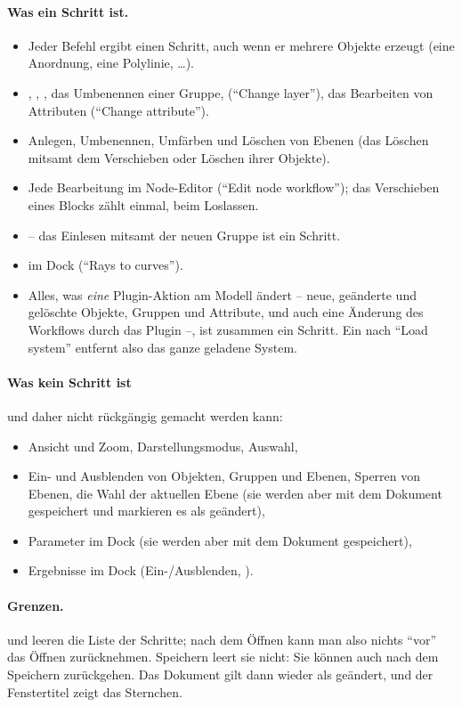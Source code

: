 \paragraph{Was ein Schritt ist.}
\begin{itemize}
  \item Jeder Befehl ergibt einen Schritt, auch wenn er mehrere Objekte erzeugt (eine
    Anordnung, eine Polylinie, \dots).
  \item {}, , , das Umbenennen einer Gruppe,  (\enquote{Change layer}), das Bearbeiten von Attributen (\enquote{Change
    attribute}).
  \item Anlegen, Umbenennen, Umfärben und Löschen von Ebenen (das Löschen mitsamt dem
    Verschieben oder Löschen ihrer Objekte).
  \item Jede Bearbeitung im Node-Editor (\enquote{Edit node workflow}); das Verschieben eines
    Blocks zählt einmal, beim Loslassen.
  \item {} -- das Einlesen mitsamt der neuen Gruppe ist ein Schritt.
  \item {} im Dock  (\enquote{Rays to curves}).
  \item Alles, was \emph{eine} Plugin-Aktion am Modell ändert -- neue, geänderte und gelöschte
    Objekte, Gruppen und Attribute, und auch eine Änderung des Workflows durch das Plugin --,
    ist zusammen ein Schritt. Ein  nach \enquote{Load system} entfernt also das ganze
    geladene System.
\end{itemize}

\paragraph{Was kein Schritt ist} und daher nicht rückgängig gemacht werden kann:
\begin{itemize}
  \item Ansicht und Zoom, Darstellungsmodus, Auswahl,
  \item Ein- und Ausblenden von Objekten, Gruppen und Ebenen, Sperren von Ebenen, die Wahl der
    aktuellen Ebene (sie werden aber mit dem Dokument gespeichert und markieren es als
    geändert),
  \item Parameter im Dock  (sie werden aber mit dem Dokument gespeichert),
  \item Ergebnisse im Dock  (Ein-/Ausblenden, ).
\end{itemize}

\paragraph{Grenzen.}  und  leeren die Liste der Schritte;
nach dem Öffnen kann man also nichts \enquote{vor} das Öffnen zurücknehmen. Speichern leert
sie nicht: Sie können auch nach dem Speichern zurückgehen. Das Dokument gilt dann wieder als
geändert, und der Fenstertitel zeigt das Sternchen.

